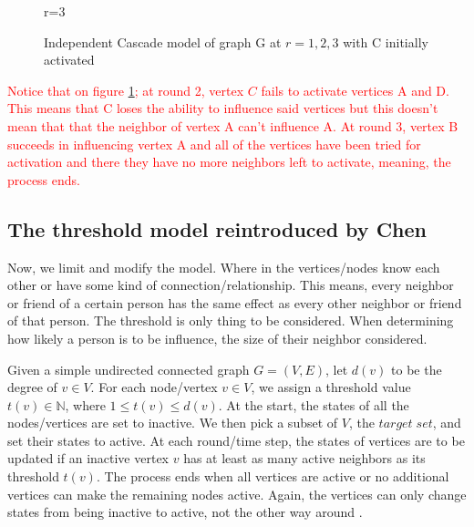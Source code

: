 \begin{figure}[h!]
\begin{minipage}{0.45\textwidth}
\caption{r=3}
	\end{minipage}
\caption{Independent Cascade model of graph G at $r=1,2,3$ with C initially activated}
\label{Independentfig1}
\end{figure}

\textcolor{red}{
Notice that on figure \ref{Independentfig1}; at round 2, vertex $C$ fails to activate vertices A and D. This means that C loses the ability to influence said vertices but this doesn't mean that that the neighbor of vertex A can't influence A. At round 3, vertex B succeeds in influencing vertex A and all of the vertices have been tried for activation and there they have no more neighbors left to activate, meaning, the process ends.}
\subsection{The threshold model reintroduced by Chen}

Now, we limit and modify the model. Where in the vertices/nodes know each other or have some kind of connection/relationship. This means, every neighbor or friend of a certain person has the same effect as every other neighbor or friend of that person. The threshold is only thing to be considered. When determining how likely a person is to be influence, the size of their neighbor considered.

Given a simple undirected connected graph $G=(V,E)$, let $d(v)$ to be the degree of $v \in V$. For each node/vertex $v \in V$, we assign a threshold value $t(v) \in \mathbb{N}$, where $1 \leq t(v) \leq d(v)$. At the start, the states of all the nodes/vertices are set to inactive. We then pick a subset of $V$, the $target\; set$, and set their states to active. At each round/time step, the states of vertices are to be updated if an inactive vertex $v$ has at least as many active neighbors as its threshold $t(v)$. The process ends when all vertices are active or no additional vertices can make the remaining nodes active. Again, the vertices can only change states from being inactive to active, not the other way around \cite{chen}.

